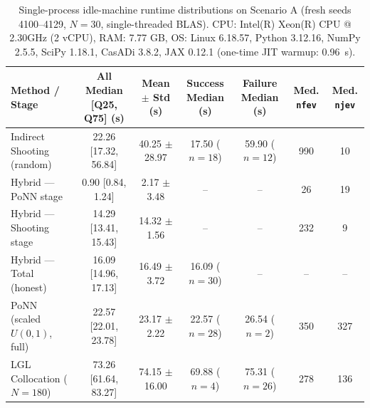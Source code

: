 \begin{table}[t]
\centering
\caption{Single-process idle-machine runtime distributions on Scenario A (fresh seeds 4100--4129, $N=30$, single-threaded BLAS). CPU: Intel(R) Xeon(R) CPU @ 2.30GHz (2 vCPU), RAM: 7.77 GB, OS: Linux 6.18.57, Python 3.12.16, NumPy 2.5.5, SciPy 1.18.1, CasADi 3.8.2, JAX 0.12.1 (one-time JIT warmup: 0.96~s).}
\label{tab:runtime_distributions}
\begin{tabular}{lcccccc}
\toprule
Method / Stage & All Median [Q25, Q75] (s) & Mean $\pm$ Std (s) & Success Median (s) & Failure Median (s) & Med. \texttt{nfev} & Med. \texttt{njev} \\
\midrule
Indirect Shooting (random) & 22.26 [17.32, 56.84] & 40.25 $\pm$ 28.97 & 17.50 ($n=18$) & 59.90 ($n=12$) & 990 & 10 \\
Hybrid — PoNN stage & 0.90 [0.84, 1.24] & 2.17 $\pm$ 3.48 & -- & -- & 26 & 19 \\
Hybrid — Shooting stage & 14.29 [13.41, 15.43] & 14.32 $\pm$ 1.56 & -- & -- & 232 & 9 \\
Hybrid — Total (honest) & 16.09 [14.96, 17.13] & 16.49 $\pm$ 3.72 & 16.09 ($n=30$) & -- & -- & -- \\
PoNN (scaled $U(0,1)$, full) & 22.57 [22.01, 23.78] & 23.17 $\pm$ 2.22 & 22.57 ($n=28$) & 26.54 ($n=2$) & 350 & 327 \\
LGL Collocation ($N=180$) & 73.26 [61.64, 83.27] & 74.15 $\pm$ 16.00 & 69.88 ($n=4$) & 75.31 ($n=26$) & 278 & 136 \\
\bottomrule
\end{tabular}
\end{table}
